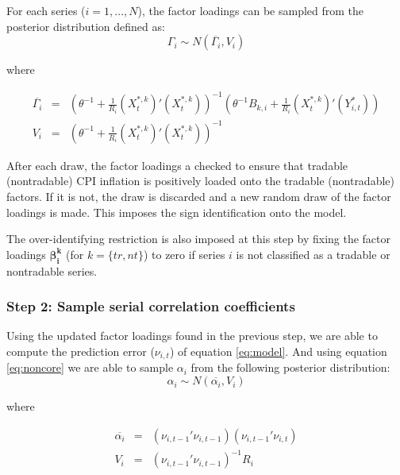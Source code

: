\documentclass[11pt,english,a4paper]{article}
\begin{document}
For each series ($i=1,\ldots,N$), the factor loadings can be sampled from the posterior distribution defined as:
\begin{equation*}
 \Gamma_{i} \sim N( \overline{\Gamma_{i}},V_{i})
\end{equation*}

where

\begin{eqnarray*}
    \overline{\Gamma_{i}} &=& \left( \theta^{-1} + \frac{1}{R_{i}} (X^{*,k}_{t})'(X^{*,k}_{t})   \right)^{-1}     \left(   \theta^{-1}  B_{k,i}  + \frac{1}{R_{i}} (X^{*,k}_{t})'(Y^{*}_{i,t})   \right) \\
    V_{i} &=& \left( \theta^{-1} + \frac{1}{R_{i}} (X^{*,k}_{t})'(X^{*,k}_{t}) \right)^{-1}
\end{eqnarray*}

After each draw, the factor loadings a checked to ensure that tradable (nontradable) CPI inflation is positively loaded onto the tradable (nontradable) factors. If it is not, the draw is discarded and a new random draw of the factor loadings is made. This imposes the sign identification onto the model.

The over-identifying restriction is also imposed at this step by fixing the factor loadings $\boldsymbol{\beta^{k}_{i}}$ (for $k=\{tr,nt\}$) to zero if series $i$ is not classified as a tradable or nontradable series.


\subsubsection*{Step 2: Sample serial correlation coefficients}

Using the updated factor loadings found in the previous step, we are able to compute the prediction error ($\nu_{i,t}$) of equation \ref{eq:model}. And using equation \ref{eq:noncore} we are able to sample $\alpha_{i}$ from the following posterior distribution:
\begin{equation*}
 \alpha_{i} \sim N( \overline{\alpha_{i}},V_{i})
\end{equation*}

where

\begin{eqnarray*}
    \overline{\alpha_{i}} &=& \left( \nu_{i,t-1}'\nu_{i,t-1}   \right)     \left(   \nu_{i,t-1}'\nu_{i,t}  \right) \\
    V_{i} &=& \left(  \nu_{i,t-1}'\nu_{i,t-1}  \right)^{-1} R_{i}
\end{eqnarray*}
\end{document}
